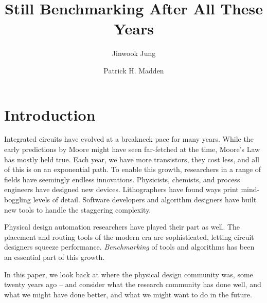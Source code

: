 \documentclass[sigconf]{acmart}
\begin{document}
\title{Still Benchmarking After All These Years}
\iffalse
\author{Blind Review}
\else
\author{Jinwook Jung}
\author{Patrick H. Madden}
 
\fi
\begin{abstract}

\end{abstract}

\begin{CCSXML}
\end{CCSXML}



%


\maketitle

\section{Introduction}

Integrated circuits have evolved at a breakneck pace for many years.  While
the early predictions by Moore\cite{Moore650114} might have seen far-fetched
at the time, Moore's Law has mostly held true.  Each year, we have more
transistors, they cost less, and all of this is on an exponential path.
To enable this growth, researchers in a range of fields have
seemingly endless innovations.  Physicists,
chemists, and process engineers have designed new devices. Lithographers
have found ways print mind-boggling levels of detail. Software developers
and algorithm designers have built new tools to handle the staggering
complexity.

Physical design automation researchers have played their part as well.
The placement and routing tools of the modern era are sophisticated,
letting circuit designers squeeze performance.
{\em Benchmarking} of tools and algorithms has been an essential
part of this growth.

In this paper, we look back at where the physical design community
was, some twenty years ago -- and consider what the research
community has done well, and what we might have done better, and
what we might want to do in the future.
\end{document}
